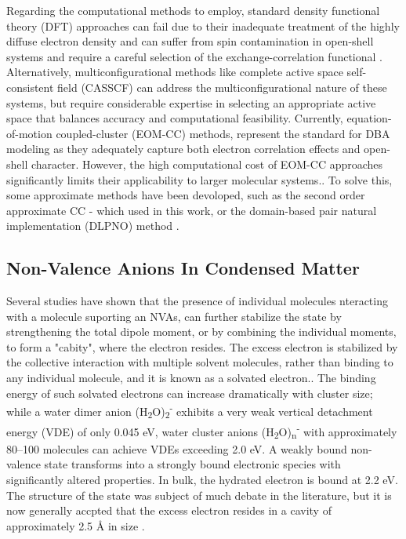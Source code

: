 Regarding the computational methods to employ, standard density functional theory (DFT) approaches can fail due to their inadequate treatment of the highly diffuse electron density and can suffer from spin contamination in open-shell systems and require a careful selection of the exchange-correlation functional \cite{thiam2023accurately}. Alternatively, multiconfigurational methods like complete active space self-consistent field (CASSCF) can address the multiconfigurational nature of these systems, but require considerable expertise in selecting an appropriate active space that balances accuracy and computational feasibility. Currently, equation-of-motion coupled-cluster (EOM-CC) methods, represent the standard for DBA modeling as they adequately capture both electron correlation effects and open-shell character. However, the high computational cost of EOM-CC approaches significantly limits their applicability to larger molecular systems.\cite{herbert2015quantum,jordan2003theory}. To solve this, some approximate methods have been devoloped, such as the second order approximate CC \cite{christiansen1995second}- which used in this work, or the domain-based pair natural implementation (DLPNO) method \cite{haldar2020multilayer}.

\subsection{Non-Valence Anions In Condensed Matter}

Several studies have shown that the presence of individual molecules nteracting with a molecule suporting an NVAs, can further stabilize the state by strengthening the total dipole moment, or by combining the individual moments, to form a "cabity", where the electron resides. The excess electron is stabilized by the collective interaction with multiple solvent molecules, rather than binding to any individual molecule, and it is known as a solvated electron.\cite{jordan2003theory,herbert2015quantum,jalbout2001dipole,clarke2025role}. The binding energy of such solvated electrons can increase dramatically with cluster size; while a water dimer anion (H\textsubscript{2}O)\textsubscript{2}\textsuperscript{-} exhibits a very weak vertical detachment energy (VDE) of only 0.045 eV, water cluster anions (H\textsubscript{2}O)\textsubscript{n}\textsuperscript{-} with approximately 80--100 molecules can achieve VDEs exceeding 2.0 eV. A weakly bound non-valence state transforms into a strongly bound electronic species with significantly altered properties\cite{herbert2015quantum}. In bulk, the hydrated electron is bound at 2.2 eV\cite{jordan2003theory,herbert2017hydrated}. The structure of the state was subject of much debate in the literature\cite{herbert2017hydrated,jordan2003theory}, but it is now generally accpted that the excess electron resides in a cavity of approximately 2.5 \r{A} in size \cite{herbert2017hydrated}. 

